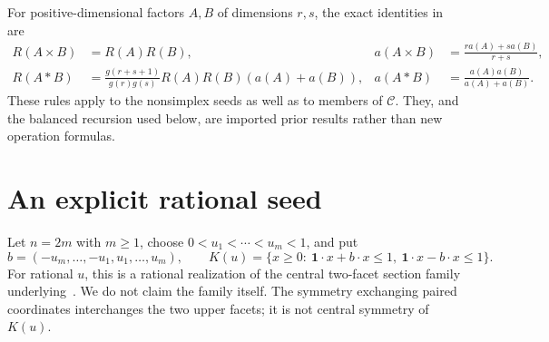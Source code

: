 \documentclass[11pt]{article}
\newcommand{\CC}{\mathcal C}
\begin{document}
For positive-dimensional factors $A,B$ of dimensions $r,s$, the exact
identities in~\cite[Sections 3--5]{mxym-calculus} are
\begin{align}
 R(A\times B)&=R(A)R(B),&
 a(A\times B)&=\frac{ra(A)+sa(B)}{r+s},\label{eq:product}\\
 R(A*B)&=\frac{g(r+s+1)}{g(r)g(s)}R(A)R(B)(a(A)+a(B)),&
 a(A*B)&=\frac{a(A)a(B)}{a(A)+a(B)}.\label{eq:join}
\end{align}
These rules apply to the nonsimplex seeds as well as to members of
$\CC$. They, and the balanced recursion used below, are imported prior
results rather than new operation formulas.

\section{An explicit rational seed}
Let $n=2m$ with $m\ge1$, choose $0<u_1<\cdots<u_m<1$, and put
\[
 b=(-u_m,\ldots,-u_1,u_1,\ldots,u_m),\qquad
 K(u)=\{x\ge0:\ \boldsymbol1\cdot x+b\cdot x\le1,
                         \ \boldsymbol1\cdot x-b\cdot x\le1\}.
\]
For rational $u$, this is a rational realization of the central two-facet
section family underlying~\cite[Section 4]{feng}. We do not claim the family itself.
The symmetry exchanging paired coordinates interchanges the two upper
facets; it is not central symmetry of $K(u)$.
\end{document}
